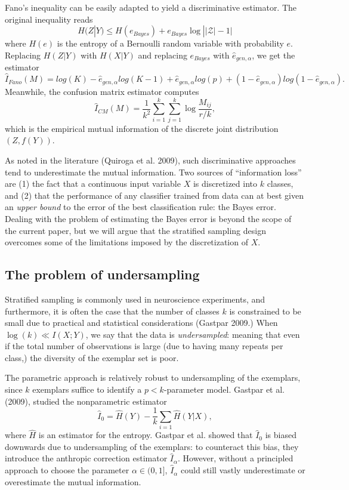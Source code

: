 \documentclass{article}
\begin{document}
Fano's inequality can be easily adapted to yield a discriminative estimator.
The original inequality reads
\[
H(Z|Y) \leq H(e_{Bayes}) + e_{Bayes} \log ||\mathcal{Z}| - 1|
\]
where $H(e)$ is the entropy of a Bernoulli random variable with probability $e$.
Replacing $H(Z|Y)$ with $H(X|Y)$ and replacing $e_{Bayes}$ with $\hat{e}_{gen, \alpha}$,
we get the estimator
\[
\hat{I}_{Fano}(M) = log(K) - \hat{e}_{gen, \alpha} log(K-1) + \hat{e}_{gen, \alpha} log(p) + (1-\hat{e}_{gen, \alpha}) log(1-\hat{e}_{gen, \alpha}).
\]
Meanwhile, the confusion matrix estimator computes
\[
\hat{I}_{CM}(M) = \frac{1}{k^2} \sum_{i=1}^k \sum_{j=1}^k \log \frac{M_{ij}}{r/k},
\]
which is the empirical mutual information of the discrete joint distribution $(Z, f(Y))$.

As noted in the literature (Quiroga et al. 2009), such
discriminative approaches tend to underestimate the mutual information.  Two sources of
``information loss'' are (1) the fact that a continuous input variable
$X$ is discretized into $k$ classes, and (2) that the performance of
any classifier trained from data can at best given an \emph{upper
  bound} to the error of the best classification rule: the Bayes
error.  Dealing with the problem of estimating the Bayes error is beyond the scope of the current paper,
but we will argue that the stratified sampling design overcomes some of the limitations
imposed by the discretization of $X$.

\subsection{The problem of undersampling}

Stratified sampling is commonly used in neuroscience experiments,
and furthermore, it is often the case that the number of classes $k$ is constrained
to be small due to practical and statistical considerations (Gastpar 2009.)
When $\log(k) \ll I(X; Y)$, we say that the data is \emph{undersampled}:
meaning that even if the total number of observations is large (due to having many repeats per class,)
the diversity of the exemplar set is poor.

The parametric approach is relatively robust to undersampling of the exemplars,
since $k$ exemplars suffice to identify a $p < k$-parameter model.
Gastpar et al. (2009), studied the nonparametric estimator
\[
\hat{I}_0 = \hat{H}(Y) - \frac{1}{k}\sum_{i=1}\hat{H}(Y|X),
\]
where $\hat{H}$ is an estimator for the entropy.
Gastpar et al. showed that $\hat{I}_0$ is biased downwards due to undersampling of the exemplars:
to counteract this bias, they introduce the anthropic correction estimator $\hat{I}_\alpha$.
However, without a principled approach to choose the parameter $\alpha \in (0,1]$,
$\hat{I}_\alpha$ could still vastly underestimate or overestimate the mutual information.
\end{document}
